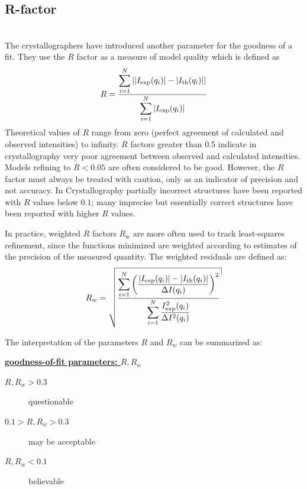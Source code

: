 \subsection{R-factor}
~\\
The crystallographers have introduced another parameter for the goodness of a fit.
They use the $R$ factor \cite{Rfactor,Hamilton1965} as a measure of model quality which is defined as
\begin{equation}\label{eqRfactor}
  R  \displaystyle  = \frac{\displaystyle\sum_{i=1}^N
{\left\vert{\left\vert I_\text{exp}(q_i)\right\vert} -
{\left\vert I_\text{th}(q_i)\right\vert}\right\vert}}{\displaystyle\sum_{i=1}^N
{\left\vert I_\text{exp}(q_i)\right\vert}}
\end{equation}
Theoretical values of $R$ range from zero (perfect
agreement of calculated and observed intensities) to infinity.  $R$
factors greater than 0.5 indicate in crystallography very poor
agreement between observed and calculated intensities. Models
refining to $R < 0.05$ are often considered to be good. However, the
$R$ factor must always be treated with caution, only as an indicator of
precision and not accuracy. In Crystallography partially incorrect
structures have been reported with $R$ values below $0.1$; many
imprecise but essentially correct structures have been reported with
higher $R$ values.

In practice, weighted $R$ factors $R_\text{w}$ are more often used
to track least-squares refinement, since the functions minimized are
weighted according to estimates of the precision of the measured
quantity. The weighted residuals are defined as:
\begin{equation} \displaystyle R_{w} =
\sqrt{\frac{\displaystyle\sum_{i=1}^N \left(\frac{\abs{I_\text{exp}(q_i)}
- \abs{I_\text{th}(q_i)}}{\Delta
I(q_i)}\right)^2}{\displaystyle\sum_{i=1}^N
\frac{I_\text{exp}^2(q_i)}{\Delta I^2(q_i)}}}
\end{equation}


The interpretation of the parameters $R$ and $R_w$ can be summarized as:

\vspace{5mm}

\uline{\bf goodness-of-fit parameters: $R,R_w$}
\begin{description}
\item[$R,R_w>0.3$] questionable
\item[$0.1 > R,R_w >0.3$] may be acceptable
\item[$R,R_w<0.1$] believable
\end{description}


